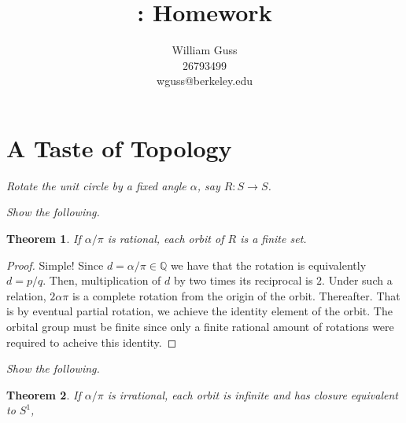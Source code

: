 \documentclass[letter]{article}
\title{\bCLASS: Homework \bHWN}
\author{William Guss\\26793499\\wguss@berkeley.edu}
\newtheorem{theorem}{Theorem}
\newenvironment{menumerate}{%
  \edef\backupindent{\the\parindent}%
  \enumerate%
  \setlength{\parindent}{\backupindent}%
}{\endenumerate}
\begin{document}
\maketitle
\thispagestyle{empty}


\setcounter{section}{1}
\section{A Taste of Topology}
\begin{menumerate}
	\setcounter{enumi}{114} %
	\item \emph{Rotate the unit circle by a fixed angle $\alpha$, say $R: S \to S$.}
		\begin{menumerate}
			\item \emph{Show the following.}
			\begin{theorem}
				If $\alpha/\pi$ is rational, each orbit of $R$ is a finite set.
			\end{theorem}
			\begin{proof}
				Simple! Since $d = \alpha/\pi \in \mathbb{Q}$ we have that the rotation is equivalently $d = p/q.$ Then, multiplication of $d$ by two times its reciprocal is $2.$ Under such a relation, $2\alpha\pi$ is a complete rotation from the origin of the orbit. Thereafter. That is by eventual partial rotation, we achieve the identity element of the orbit. The orbital group must be finite since only a finite rational amount of rotations were required to acheive this identity.
			\end{proof}

			\item \emph{Show the following.}
			\begin{theorem}
				If $\alpha/\pi$ is irrational, each orbit is infinite and has closure equivalent to $S^1$,
			\end{theorem}
		\end{menumerate}

	\setcounter{enumi}{125}
	\item
	\item
	\item
	\item
	\item 
	\item


	\setcounter{enumi}{132}
	\item

	\setcounter{enumi}{151}
	\item 
\end{menumerate}
\end{document}
